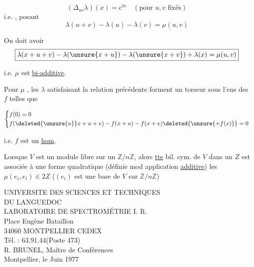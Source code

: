 \[
 (\Delta_{uv}\lambda)(x)=\mathrm{c}^{\mathrm{te}}\quad(\text{pour }u,v\text{ fixés})
\]
i.e. , posant
\[
 \lambda(u+v)-\lambda(u)-\lambda(v)=\mu(u,v)
\]

On doit avoir
\[
 \boxed{\lambda(x+u+v)-\lambda(\unsure{x+u})-\lambda(\unsure{x+v})+\lambda(x)=\mu(u,v)}
\]

i.e. $\mu$ est \uline{bi-additive}.


Pour $\mu$  , les $\lambda$ satisfaisant la relation précédente  forment un torseur sous l'ens des $f$ telles que

\[
 \left\{\begin{aligned}
 &f(0)=0\\
 &f(\deleted{\unsure{u}}x+u+v)-f(x+u)-f(x+v)\deleted{\unsure{+f(x)}}=0
 \end{aligned}\right.
\]



 i.e. $f$ est un  \uline{hom}.

 Lorsque $V$ est un module libre sur un $\mathbb Z/n\mathbb Z$, alors \uline{tte} \uline{} bil. sym. de $V$ dans un $Z$ est associée à une forme quadratique (définie mod application \uline{additive})  les $\mu(e_i,e_i)\in2Z$ ($(e_i)$ est une base de $V$ sur $\mathbb Z/n\mathbb Z$) 

UNIVERSITE DES SCIENCES ET TECHNIQUES\\
DU LANGUEDOC\\
LABORATOIRE DE SPECTROMÉTRIE I. R.\\
Place Eugène Bataillon\\
34060 MONTPELLIER CEDEX\\
Tél. : 63.91.44\quad (Poste 473)\\
R. BRUNEL, Maître de Conférences\\

Montpellier, le Juin 1977\\

